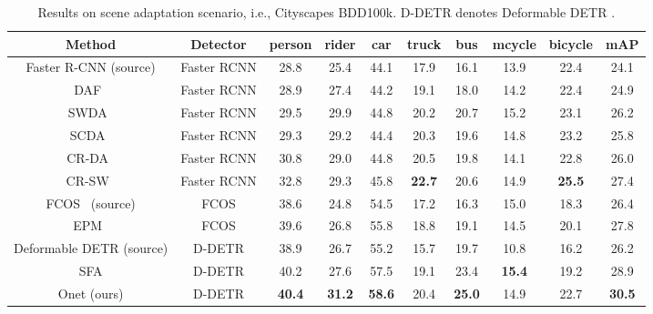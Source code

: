 \documentclass[sigconf]{acmart}
\begin{document}
    

\begin{table*}[t]
\centering
            \small
            \caption{Results on scene adaptation scenario, i.e., Cityscapes  BDD100k. D-DETR denotes Deformable DETR \cite{zhu2020deformable}.}
            \label{tab:bdd}
            \setlength{\tabcolsep}{3.2mm}
            \begin{tabular}{c|c|ccccccc|c}
                \toprule[1.0pt]
                Method & Detector & person & rider & car & truck & bus & mcycle & bicycle & mAP \\
            
                \hline
                Faster R-CNN (source) & Faster RCNN & 28.8 & 25.4 & 44.1 & 17.9 & 16.1 & 13.9 & 22.4 & 24.1 \\
                DAF~\cite{dafaster} & Faster RCNN & 28.9 & 27.4 & 44.2 & 19.1 & 18.0 & 14.2 & 22.4 & 24.9 \\
                SWDA~\cite{strong-weak} & Faster RCNN & 29.5 & 29.9 & 44.8 & 20.2 & 20.7 & 15.2 & 23.1 & 26.2 \\
                SCDA~\cite{scda} & Faster RCNN & 29.3 & 29.2 & 44.4 & 20.3 & 19.6 & 14.8 & 23.2 & 25.8 \\
                CR-DA~\cite{xu2020exploring} & Faster RCNN & 30.8 & 29.0 & 44.8 & 20.5 & 19.8 & 14.1 & 22.8 & 26.0 \\
                CR-SW~\cite{xu2020exploring} & Faster RCNN & 32.8 & 29.3 & 45.8 & \textbf{22.7} & 20.6 & 14.9 & \textbf{25.5} & 27.4 \\
                \hline
                FCOS~\cite{tian2019fcos} (source) & FCOS & 38.6 & 24.8 & 54.5 & 17.2 & 16.3 & 15.0 & 18.3 & 26.4 \\
                EPM~\cite{hsu2020every} & FCOS & 39.6 & 26.8 & 55.8 & 18.8 & 19.1 & 14.5 & 20.1 & 27.8 \\
                \hline
                Deformable DETR (source) & D-DETR & 38.9 & 26.7 & 55.2 & 15.7 & 19.7 & 10.8 & 16.2 & 26.2 \\
                SFA \cite{wang2021exploring} & D-DETR &  40.2 & 27.6 & 57.5 & 19.1 & 23.4 & \textbf{15.4} & 19.2 & 28.9 \\
                Onet (ours) & D-DETR & \textbf{40.4} & \textbf{31.2} & \textbf{58.6} & 20.4 & \textbf{25.0} & 14.9 & 22.7 & \textbf{30.5} \\
                \bottomrule[1.0pt]
            \end{tabular}
\vspace{-2mm}
    \end{table*}
\end{document}
